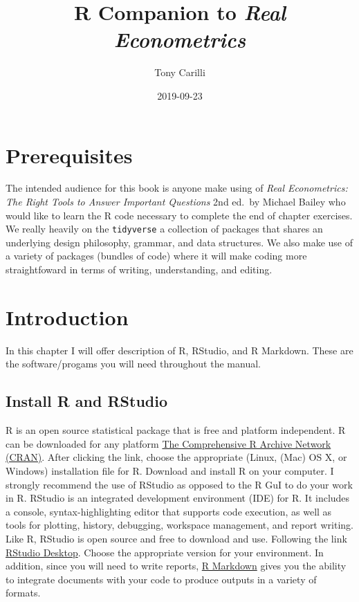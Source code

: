 \documentclass[]{book}
\title{R Companion to \emph{Real Econometrics}}
\author{Tony Carilli}
\date{2019-09-23}
\begin{document}
\maketitle

{
\setcounter{tocdepth}{1}
\tableofcontents
}
\hypertarget{prerequisites}{%
\chapter{Prerequisites}\label{prerequisites}}

The intended audience for this book is anyone make using of \emph{Real Econometrics: The Right Tools to Answer Important Questions} 2nd ed.~by Michael Bailey who would like to learn the R code necessary to complete the end of chapter exercises. We really heavily on the \texttt{tidyverse} a collection of packages that shares an underlying design philosophy, grammar, and data structures. We also make use of a variety of packages (bundles of code) where it will make coding more straightfoward in terms of writing, understanding, and editing.

\hypertarget{intro}{%
\chapter{Introduction}\label{intro}}

In this chapter I will offer description of R, RStudio, and R Markdown. These are the software/progams you will need throughout the manual.

\hypertarget{install-r-and-rstudio}{%
\section{Install R and RStudio}\label{install-r-and-rstudio}}

R is an open source statistical package that is free and platform independent. R can be downloaded for any platform \href{https://cran.r-project.org}{The Comprehensive R Archive Network (CRAN)}. After clicking the link, choose the appropriate (Linux, (Mac) OS X, or Windows) installation file for R. Download and install R on your computer. I strongly recommend the use of RStudio as opposed to the R GuI to do your work in R. RStudio is an integrated development environment (IDE) for R. It includes a console, syntax-highlighting editor that supports code execution, as well as tools for plotting, history, debugging, workspace management, and report writing. Like R, RStudio is open source and free to download and use. Following the link \href{https://www.rstudio.com/products/rstudio/download/\#download}{RStudio Desktop}. Choose the appropriate version for your environment. In addition, since you will need to write reports, \href{https://bookdown.org/yihui/rmarkdown/}{R Markdown} gives you the ability to integrate documents with your code to produce outputs in a variety of formats.
\end{document}
